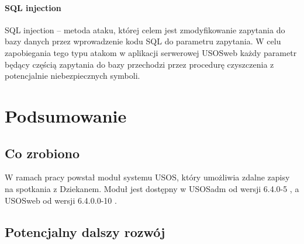 \documentclass[licencjacka]{pracamgr}
\begin{document}
\subsubsection{SQL injection}
SQL injection -- metoda ataku, której celem jest zmodyfikowanie zapytania do bazy danych przez wprowadzenie kodu SQL do parametru zapytania. W celu 
zapobiegania tego typu atakom w aplikacji serwerowej USOSweb każdy parametr będący częścią zapytania do bazy przechodzi przez procedurę czyszczenia z 
potencjalnie niebezpiecznych symboli.




\chapter{Podsumowanie}  \label{chap:rozwoj}
\section{Co zrobiono}
W ramach pracy powstał moduł systemu USOS, który umożliwia zdalne zapisy na spotkania z Dziekanem. Moduł jest dostępny w USOSadm od wersji 6.4.0-5 \cite{dziennikadm}, a USOSweb od wersji 6.4.0.0-10 \cite{dziennikweb}.

\section{Potencjalny dalszy rozwój}
\end{document}
